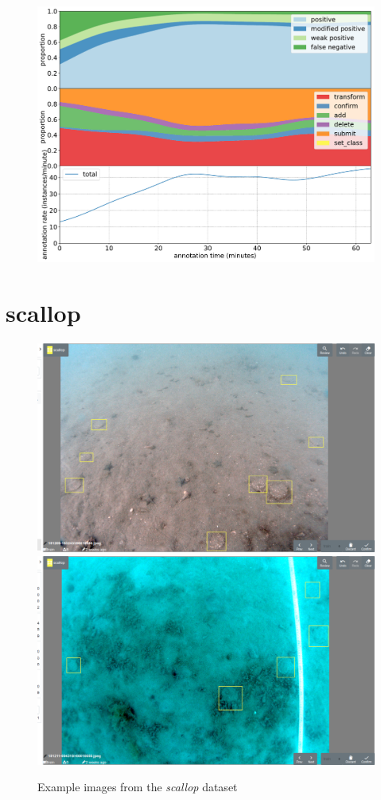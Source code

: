 \begin{figure}[!h]
\centering
\includegraphics[width=1.0\linewidth]{charts/action_annotations/branches.pdf}
\caption{  }
\label{fig:branches_annotation}
\end{figure}

\pagebreak
\section {scallop}

\begin{figure}[!h]
  \includegraphics[width=0.475\linewidth]{figures/annotation/screenshots/scallops.png}
  \hfill
  \includegraphics[width=0.475\linewidth]{figures/annotation/screenshots/scallops3.png}
\caption{Example images from the \emph{scallop} dataset}
\label{fig:scallop_dataset}  
\end{figure}


